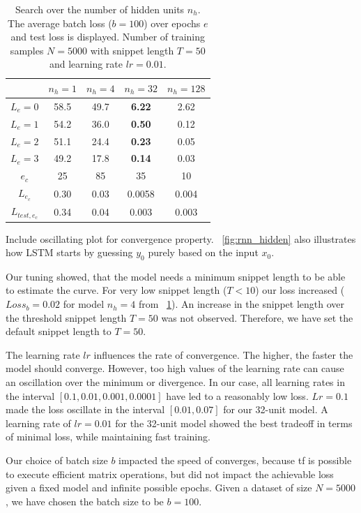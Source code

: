 \begin{table}[]
\centering
\begin{tabular}{ c| c| c| c| c}
& $n_h=1$ & $n_h=4$ &$n_h=32$ & $n_h=128$\\
\hline
$L_e=0$ & 58.5 & 49.7  & \textbf{6.22} & 2.62      \\
$L_e=1$ & 54.2 & 36.0  & \textbf{0.50} & 0.12      \\
$L_e=2$ & 51.1 & 24.4  & \textbf{0.23} & 0.05      \\
$L_e=3$ & 49.2 & 17.8  & \textbf{0.14} & 0.03      \\
\hline
$e_c$ 			& 25 	& 85 	& 35	& 10 		\\
$L_{e_c}$		&  0.30	& 0.03	& 0.0058& 0.004 	\\
$L_{test, e_c}$	& 0.34	& 0.04	&0.003	& 0.003 	\\     
\end{tabular}
\caption{Search over the number of hidden units $n_h$. The average batch loss ($b=100$) over epochs $e$ and test loss is displayed. Number of training samples $N = 5000$ with snippet length $T=50$ and learning rate $lr=0.01$.}
\label{tab:rnn_hidden}
\end{table}

Include oscillating plot for convergence property.
~\cref{fig:rnn_hidden} also illustrates how LSTM starts by guessing $y_0$ purely based on the input $x_0$. 

Our tuning showed, that the model needs a minimum snippet length to be able to estimate the curve.
For very low snippet length ($T<10$) our loss increased ($Loss_b=0.02$ for model $n_h=4$ from ~\cref{tab:rnn_hidden}).
An increase in the snippet length over the threshold snippet length $T=50$ was not observed.
Therefore, we have set the default snippet length to $T=50$.

The learning rate $lr$ influences the rate of convergence.
The higher, the faster the model should converge.
However, too high values of the learning rate can cause an oscillation over the minimum or divergence.
In our case, all learning rates in the interval $[0.1, 0.01, 0.001, 0.0001]$ have led to a reasonably low loss.
$Lr=0.1$ made the loss oscillate in the interval $[0.01, 0.07]$ for our 32-unit model.
A learning rate of $lr=0.01$ for the 32-unit model showed the best tradeoff in terms of minimal loss, while maintaining fast training.

Our choice of batch size $b$ impacted the speed of converges, because tf is possible to execute efficient matrix operations, but did not impact the achievable loss given a fixed model and infinite possible epochs.
Given a dataset of size $N=5000$, we have chosen the batch size to be $b=100$.

